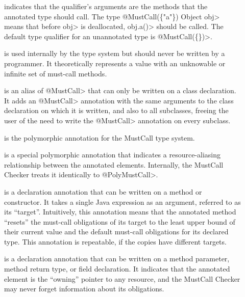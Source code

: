 \begin{description}

\item[]
  indicates that the qualifier's arguments are the methods that the annotated type
  should call. The type \<@MustCall(\{"a"\}) Object obj> means
  that before \<obj> is deallocated, \<obj.a()> should be called.
  The default type qualifier for an unannotated type is \<@MustCall(\{\})>.

\item[]
  is used internally by the type system but should never be written by a
  programmer.  It theoretically represents a value with an unknowable or infinite set
  of must-call methods.

\item[]
  is an alias of \<@MustCall> that can only be written on a class declaration. It adds an \<@MustCall>
  annotation with the same arguments to
  the class declaration on which it is written, and also to all subclasses, freeing the user of the need
  to write the \<@MustCall> annotation on every subclass.

\item[]
  is the polymorphic annotation for the MustCall type system.

\item[]
  is a special polymorphic annotation that indicates a resource-aliasing relationship between
  the annotated elements. Internally, the MustCall Checker treats it identically to \<@PolyMustCall>.

\item[]
  is a declaration annotation that can be written on a method or constructor. It takes a single Java expression as an
  argument, referred to as its ``target''. Intuitively, this annotation means that the annotated method
  ``resets'' the must-call obligations of its target to the least upper bound of their current value and the default
  must-call obligations for its declared type. This annotation is repeatable, if the copies have different targets.

\item[]
  is a declaration annotation that can be written on a method parameter, method return type, or
  field declaration. It indicates that the annotated element is the ``owning'' pointer to any resource,
  and the MustCall Checker may never forget information about its obligations.


\end{description}
